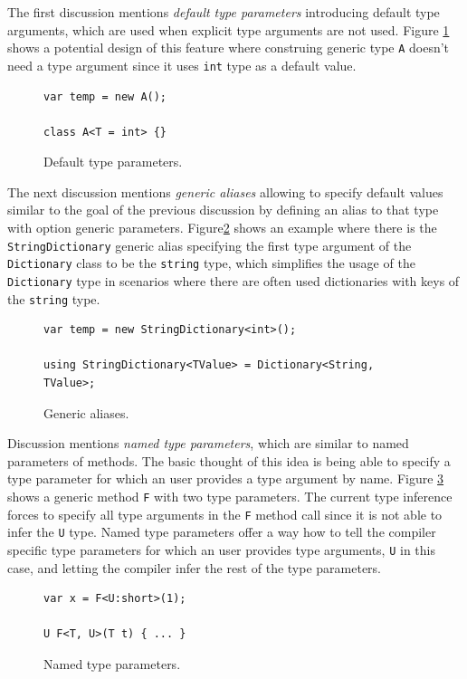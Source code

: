 The first discussion \cite{online:DefTypeParam} mentions \textit{default type parameters} introducing default type arguments, which are used when explicit type arguments are not used. 
Figure \ref{img19:defTypeParam} shows a potential design of this feature where construing generic type \texttt{A} doesn’t need a type argument since it uses \texttt{int} type as a default value. 
\begin{figure}[h]
\begin{lstlisting}[style=csharp]
var temp = new A();

class A<T = int> {}
\end{lstlisting}
\caption{Default type parameters.}
\label{img19:defTypeParam}
\end{figure}
\par
The next discussion \cite{online:GenAlias} mentions \textit{generic aliases} allowing to specify default values similar to the goal of the previous discussion by defining an alias to that type with option generic parameters. 
Figure\ref{img20:genAlias} shows an example where there is the \texttt{StringDictionary} generic alias specifying the first type argument of the \texttt{Dictionary} class to be the \texttt{string} type, which simplifies the usage of the \texttt{Dictionary} type in scenarios where there are often used dictionaries with keys of the \texttt{string} type.
\begin{figure}[h]
\begin{lstlisting}[style=csharp]
var temp = new StringDictionary<int>();

using StringDictionary<TValue> = Dictionary<String, TValue>;
\end{lstlisting}
\caption{Generic aliases.}
\label{img20:genAlias}
\end{figure}
\par
Discussion \cite{online:NamedTypeParam} mentions \textit{named type parameters}, which are similar to named parameters of methods. 
The basic thought of this idea is being able to specify a type parameter for which an user provides a type argument by name. 
Figure \ref{img21:NamedTParam} shows a generic method \texttt{F} with two type parameters. 
The current type inference forces to specify all type arguments in the \texttt{F} method call since it is not able to infer the \texttt{U} type. 
Named type parameters offer a way how to tell the compiler specific type parameters for which an user provides type arguments, \texttt{U} in this case, and letting the compiler infer the rest of the type parameters.
\begin{figure}[h]
\begin{lstlisting}[style=csharp]
var x = F<U:short>(1);

U F<T, U>(T t) { ... }
\end{lstlisting}
\caption{Named type parameters.}
\label{img21:NamedTParam}
\end{figure}
